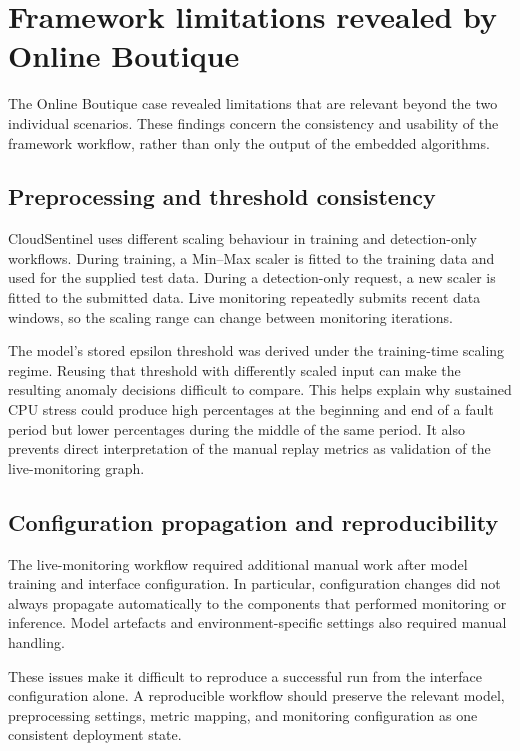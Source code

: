 \section{Framework limitations revealed by Online Boutique}
The Online Boutique case revealed limitations that are relevant beyond the two individual scenarios. These findings concern the consistency and usability of the framework workflow, rather than only the output of the embedded algorithms.

\subsection{Preprocessing and threshold consistency}
\label{sec:preprocessing_threshold_consistency}
CloudSentinel uses different scaling behaviour in training and detection-only workflows. During training, a Min--Max scaler is fitted to the training data and used for the supplied test data. During a detection-only request, a new scaler is fitted to the submitted data. Live monitoring repeatedly submits recent data windows, so the scaling range can change between monitoring iterations.

The model's stored epsilon threshold was derived under the training-time scaling regime. Reusing that threshold with differently scaled input can make the resulting anomaly decisions difficult to compare. This helps explain why sustained CPU stress could produce high percentages at the beginning and end of a fault period but lower percentages during the middle of the same period. It also prevents direct interpretation of the manual replay metrics as validation of the live-monitoring graph.

\subsection{Configuration propagation and reproducibility}
The live-monitoring workflow required additional manual work after model training and interface configuration. In particular, configuration changes did not always propagate automatically to the components that performed monitoring or inference. Model artefacts and environment-specific settings also required manual handling.

These issues make it difficult to reproduce a successful run from the interface configuration alone. A reproducible workflow should preserve the relevant model, preprocessing settings, metric mapping, and monitoring configuration as one consistent deployment state.

